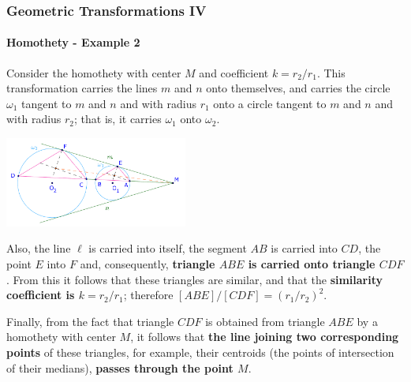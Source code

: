 \documentclass[8pt,xcolor=table,dvipsnames]{beamer}
\begin{document}
\begin{frame}[t]
    \frametitle{Geometric Transformations IV}
    \framesubtitle{Homothety - Example 2}
    Consider the homothety with center $M$ and coefficient $k = r_2/r_1$.
    This transformation carries the lines $m$ and $n$ onto themselves, and carries the circle $\omega_1$ tangent to $m$ and $n$ and with radius $r_1$ onto
    a circle tangent to $m$ and $n$ and with radius $r_2$; that is, it carries $\omega_1$ onto $\omega_2$.    
    \begin{center}
        \includegraphics[width=6cm]{./svg/pdf/homothety-p2.pdf}
    \end{center}
    Also, the line $\ell$ is carried into itself, the segment $AB$ is carried into $CD$, the point $E$ into $F$ and,
    consequently, \textbf{triangle $ABE$ is carried onto triangle $CDF$}.
    From this it follows that these triangles are similar, and that the \textbf{similarity coefficient is $k = r_2/r_1$}; therefore $[ABE]/[CDF] = (r_1/r_2)^2.$

    \bigbreak
    Finally, from the fact that triangle $CDF$ is obtained from triangle $ABE$ by a homothety with center $M$,
    it follows that \textbf{the line joining two corresponding points} of these triangles,
    for example, their centroids (the points of intersection of their medians),
    \textbf{passes through the point $M$}. 
\end{frame}
\end{document}
